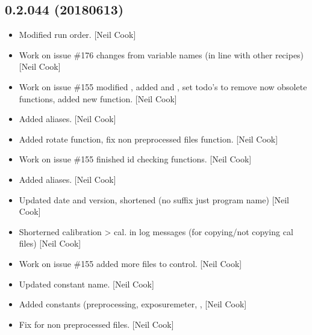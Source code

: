 \documentclass[a4paper,10pt,english]{report}
\begin{document}
\subsection{0.2.044 (2018\sphinxhyphen{}06\sphinxhyphen{}13)}
\label{\detokenize{misc/changelog:id440}}\begin{itemize}
\item {} 
Modified run order. {[}Neil Cook{]}

\item {} 
Work on issue \#176 \sphinxhyphen{} changes from variable names (in line with other
recipes) {[}Neil Cook{]}

\item {} 
Work on issue \#155 \sphinxhyphen{} modified , added
 and , set todo’s to remove now
obsolete functions, added new  function. {[}Neil Cook{]}

\item {} 
Added aliases. {[}Neil Cook{]}

\item {} 
Added rotate function, fix non pre\sphinxhyphen{}processed files function. {[}Neil
Cook{]}

\item {} 
Work on issue \#155 \sphinxhyphen{} finished id checking functions. {[}Neil Cook{]}

\item {} 
Added aliases. {[}Neil Cook{]}

\item {} 
Updated date and version, shortened  (no suffix just program
name) {[}Neil Cook{]}

\item {} 
Shorterned calibration \textendash{}\textgreater{} cal. in log messages (for copying/not
copying cal files) {[}Neil Cook{]}

\item {} 
Work on issue \#155 \sphinxhyphen{} added more files to control. {[}Neil Cook{]}

\item {} 
Updated constant name. {[}Neil Cook{]}

\item {} 
Added constants (preprocessing, exposuremeter, ,  {[}Neil
Cook{]}

\item {} 
Fix for non pre\sphinxhyphen{}processed files. {[}Neil Cook{]}


\end{itemize}
\end{document}
